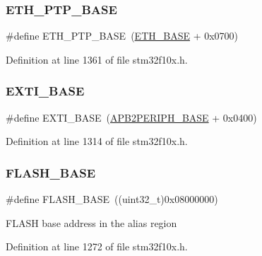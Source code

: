 \subsubsection{\texorpdfstring{E\+T\+H\+\_\+\+P\+T\+P\+\_\+\+B\+A\+SE}{ETH\_PTP\_BASE}}
{\footnotesize\ttfamily \#define E\+T\+H\+\_\+\+P\+T\+P\+\_\+\+B\+A\+SE~(\hyperlink{group___peripheral__memory__map_gad965a7b1106ece575ed3da10c45c65cc}{E\+T\+H\+\_\+\+B\+A\+SE} + 0x0700)}



Definition at line 1361 of file stm32f10x.\+h.

\mbox{\label{group___peripheral__memory__map_ga87371508b3bcdcd98cd1ec629be29061}} 
\subsubsection{\texorpdfstring{E\+X\+T\+I\+\_\+\+B\+A\+SE}{EXTI\_BASE}}
{\footnotesize\ttfamily \#define E\+X\+T\+I\+\_\+\+B\+A\+SE~(\hyperlink{group___peripheral__memory__map_ga25b99d6065f1c8f751e78f43ade652cb}{A\+P\+B2\+P\+E\+R\+I\+P\+H\+\_\+\+B\+A\+SE} + 0x0400)}



Definition at line 1314 of file stm32f10x.\+h.

\mbox{\label{group___peripheral__memory__map_ga23a9099a5f8fc9c6e253c0eecb2be8db}} 
\subsubsection{\texorpdfstring{F\+L\+A\+S\+H\+\_\+\+B\+A\+SE}{FLASH\_BASE}}
{\footnotesize\ttfamily \#define F\+L\+A\+S\+H\+\_\+\+B\+A\+SE~((uint32\+\_\+t)0x08000000)}

F\+L\+A\+SH base address in the alias region 

Definition at line 1272 of file stm32f10x.\+h.

